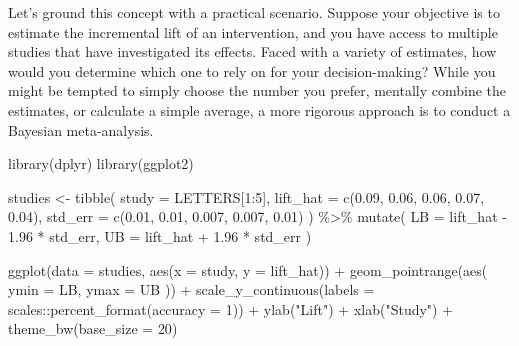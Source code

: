 \documentclass[
  letterpaper,
  DIV=11,
  numbers=noendperiod]{scrreprt}
\newenvironment{Shaded}{\begin{snugshade}}{\end{snugshade}}
\newcommand{\AttributeTok}[1]{\textcolor[rgb]{0.40,0.45,0.13}{#1}}
\newcommand{\DecValTok}[1]{\textcolor[rgb]{0.68,0.00,0.00}{#1}}
\newcommand{\FloatTok}[1]{\textcolor[rgb]{0.68,0.00,0.00}{#1}}
\newcommand{\FunctionTok}[1]{\textcolor[rgb]{0.28,0.35,0.67}{#1}}
\newcommand{\NormalTok}[1]{\textcolor[rgb]{0.00,0.23,0.31}{#1}}
\newcommand{\OtherTok}[1]{\textcolor[rgb]{0.00,0.23,0.31}{#1}}
\newcommand{\SpecialCharTok}[1]{\textcolor[rgb]{0.37,0.37,0.37}{#1}}
\newcommand{\StringTok}[1]{\textcolor[rgb]{0.13,0.47,0.30}{#1}}
\begin{document}
Let's ground this concept with a practical scenario. Suppose your
objective is to estimate the incremental lift of an intervention, and
you have access to multiple studies that have investigated its effects.
Faced with a variety of estimates, how would you determine which one to
rely on for your decision-making? While you might be tempted to simply
choose the number you prefer, mentally combine the estimates, or
calculate a simple average, a more rigorous approach is to conduct a
Bayesian meta-analysis.

\begin{Shaded}
\begin{Highlighting}[]
\FunctionTok{library}\NormalTok{(dplyr)}
\FunctionTok{library}\NormalTok{(ggplot2)}

\NormalTok{studies }\OtherTok{\textless{}{-}} \FunctionTok{tibble}\NormalTok{(}
  \AttributeTok{study =}\NormalTok{ LETTERS[}\DecValTok{1}\SpecialCharTok{:}\DecValTok{5}\NormalTok{],}
  \AttributeTok{lift\_hat =} \FunctionTok{c}\NormalTok{(}\FloatTok{0.09}\NormalTok{, }\FloatTok{0.06}\NormalTok{, }\FloatTok{0.06}\NormalTok{, }\FloatTok{0.07}\NormalTok{, }\FloatTok{0.04}\NormalTok{),}
  \AttributeTok{std\_err =} \FunctionTok{c}\NormalTok{(}\FloatTok{0.01}\NormalTok{, }\FloatTok{0.01}\NormalTok{, }\FloatTok{0.007}\NormalTok{, }\FloatTok{0.007}\NormalTok{, }\FloatTok{0.01}\NormalTok{)}
\NormalTok{) }\SpecialCharTok{\%\textgreater{}\%}
  \FunctionTok{mutate}\NormalTok{(}
    \AttributeTok{LB =}\NormalTok{ lift\_hat }\SpecialCharTok{{-}} \FloatTok{1.96} \SpecialCharTok{*}\NormalTok{ std\_err,}
    \AttributeTok{UB =}\NormalTok{ lift\_hat }\SpecialCharTok{+} \FloatTok{1.96} \SpecialCharTok{*}\NormalTok{ std\_err}
\NormalTok{  )}
\end{Highlighting}
\end{Shaded}

\begin{Shaded}
\begin{Highlighting}[]
\FunctionTok{ggplot}\NormalTok{(}\AttributeTok{data =}\NormalTok{ studies, }\FunctionTok{aes}\NormalTok{(}\AttributeTok{x =}\NormalTok{ study, }\AttributeTok{y =}\NormalTok{ lift\_hat)) }\SpecialCharTok{+}
  \FunctionTok{geom\_pointrange}\NormalTok{(}\FunctionTok{aes}\NormalTok{(}
    \AttributeTok{ymin =}\NormalTok{ LB,}
    \AttributeTok{ymax =}\NormalTok{ UB}
\NormalTok{  )) }\SpecialCharTok{+}
  \FunctionTok{scale\_y\_continuous}\NormalTok{(}\AttributeTok{labels =}\NormalTok{ scales}\SpecialCharTok{::}\FunctionTok{percent\_format}\NormalTok{(}\AttributeTok{accuracy =} \DecValTok{1}\NormalTok{)) }\SpecialCharTok{+}
  \FunctionTok{ylab}\NormalTok{(}\StringTok{"Lift"}\NormalTok{) }\SpecialCharTok{+}
  \FunctionTok{xlab}\NormalTok{(}\StringTok{"Study"}\NormalTok{) }\SpecialCharTok{+}
  \FunctionTok{theme\_bw}\NormalTok{(}\AttributeTok{base\_size =} \DecValTok{20}\NormalTok{)}
\end{Highlighting}
\end{Shaded}
\end{document}
